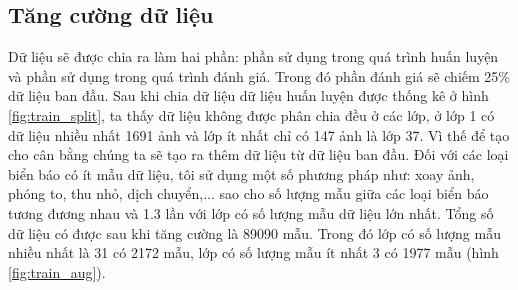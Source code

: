 \subsection{Tăng cường dữ liệu}
\hspace{5mm} Dữ liệu sẽ được chia ra làm hai phần: phần sử dụng trong quá trình huấn luyện và phần sử dụng trong quá trình đánh giá. Trong đó phần đánh giá sẽ chiếm 25\% dữ liệu ban đầu. Sau khi chia dữ liệu dữ liệu huấn luyện được thống kê ở hình \ref{fig:train_split}, ta thấy dữ liệu không được phân chia đều ở các lớp, ở lớp 1 có dữ liệu nhiều nhất 1691 ảnh và lớp ít nhất chỉ có 147 ảnh là lớp 37. Vì thế để tạo cho cân bằng chúng ta sẽ tạo ra thêm dữ liệu từ dữ liệu ban đầu. Đối với các loại biển báo có ít mẫu dữ liệu, tôi sử dụng một số phương pháp như: xoay ảnh, phóng to, thu nhỏ, dịch chuyển,... sao cho số lượng mẫu giữa các loại biển báo tương đương nhau và 1.3 lần với lớp có số lượng mẫu dữ liệu lớn nhất.
Tổng số dữ liệu có được sau khi tăng cường là 89090 mẫu. Trong đó lớp có số lượng mẫu nhiều nhất là 31 có 2172 mẫu, lớp có số lượng mẫu ít nhất 3 có 1977 mẫu (hình \ref{fig:train_aug}). 

